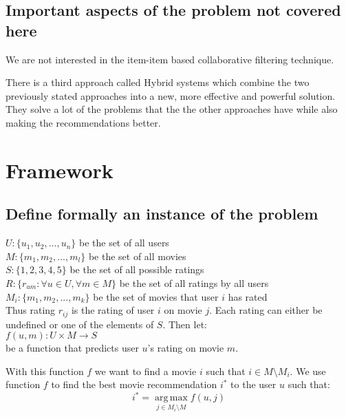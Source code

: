 \documentclass[a4paper,11pt]{article}
\begin{document}
\subsection{Important aspects of the problem not covered here}
We are not interested in the item-item based collaborative filtering technique.

There is a third approach called Hybrid systems which combine the two previously stated approaches into a new,
more effective and powerful solution. They solve a lot of the problems that the the other approaches have while
also making the recommendations better.

\section{Framework}
\subsection{Define formally an instance of the problem}
$U : \{u_1, u_2, ..., u_n\}$ be the set of all users\\
$M : \{m_1, m_2, ..., m_l\}$ be the set of all movies\\
$S : \{1,2,3,4,5\}$ be the set of all possible ratings \\
$R : \{r_{um} : \forall u \in U, \forall m \in M\}$ be the set of all ratings by all users\\
$M_i : \{m_1, m_2, ..., m_k\}$ be the set of movies that user $i$ has rated \\

Thus rating $r_{ij}$ is the rating of user $i$ on movie $j$. Each rating can either be undefined
or one of the elements of $S$. Then let: \\

$f(u,m) : U \times M \to S$ \\

be a function that predicts user $u$'s rating on movie $m$.

With this function $f$ we want to find a movie $i$ such that $i \in M \setminus M_i$.
We use function $f$ to find the best movie recommendation $i^{*}$ to
the user $u$ such that: \\
\[ i^{*} = \operatorname*{arg\,max}_{j \in M_i \setminus M} f(u,j) \]
\end{document}
